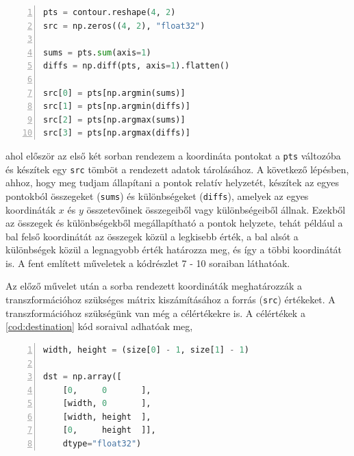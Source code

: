 \vspace{2mm}
\hspace{-10mm}
\begin{minipage}{\linewidth}
\begin{lstlisting}[language=Python, numbers=left, caption={Átrendező algoritmus.}, label={cod:atrendezes}]
pts = contour.reshape(4, 2)
src = np.zeros((4, 2), "float32")

sums = pts.sum(axis=1)
diffs = np.diff(pts, axis=1).flatten()

src[0] = pts[np.argmin(sums)]
src[1] = pts[np.argmin(diffs)]
src[2] = pts[np.argmax(sums)]
src[3] = pts[np.argmax(diffs)]
\end{lstlisting}
\end{minipage}

\par ahol először az első két sorban rendezem a koordináta pontokat a \lstinline{pts} változóba és készítek egy \lstinline{src} tömböt a rendezett adatok tárolásához. A következő lépésben, ahhoz, hogy meg tudjam állapítani a pontok relatív helyzetét, készítek az egyes pontokból összegeket (\lstinline{sums}) és különbségeket (\lstinline{diffs}), amelyek az egyes koordináták $x$ és $y$ összetevőinek összegeiből vagy különbségeiből állnak. Ezekből az összegek és különbségekből megállapítható a pontok helyzete, tehát például a bal felső koordinátát az összegek közül a legkisebb érték, a bal alsót a különbségek közül a legnagyobb érték határozza meg, és így a többi koordinátát is. A fent említett műveletek a kódrészlet 7 - 10 soraiban láthatóak.
\par Az előző művelet után a sorba rendezett koordináták meghatározzák a transzformációhoz szükséges mátrix kiszámításához a forrás (\lstinline{src}) értékeket. A transzformációhoz szükségünk van még a célértékekre is.
\newline A célértékek a \ref{cod:destination} kód soraival adhatóak meg,

\vspace{2mm}
\hspace{-10mm}
\begin{minipage}{\linewidth}
\begin{lstlisting}[language=Python, numbers=left, caption={A kimeneti értékek megadása.}, label={cod:destination}]
width, height = (size[0] - 1, size[1] - 1)

dst = np.array([
    [0,     0       ],
    [width, 0       ],
    [width, height  ],
    [0,     height  ]],
    dtype="float32")
\end{lstlisting}
\end{minipage}

